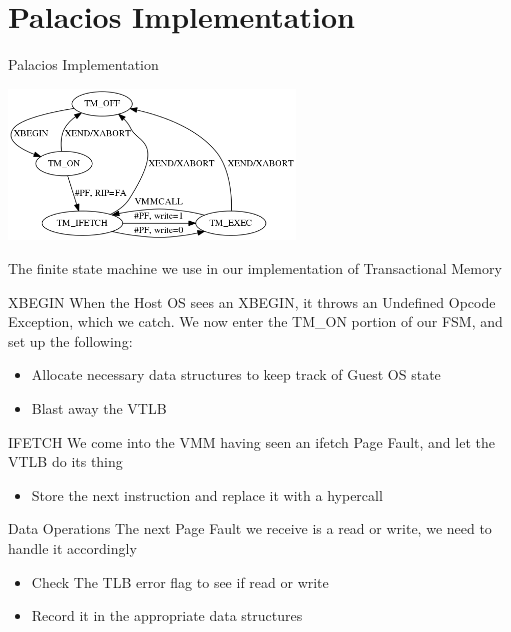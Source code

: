 \documentclass{beamer}
\begin{document}
\section{Palacios Implementation}
\begin{frame}{Palacios Implementation}
  \begin{center}
    \includegraphics[width=3.0in]{fsm.png}
  \end{center}
    
  The finite state machine we use in our implementation of Transactional
  Memory
\end{frame}

\begin{frame}{XBEGIN}
  When the Host OS sees an XBEGIN, it throws an Undefined Opcode Exception,
  which we catch. We now enter the TM\_ON portion of our FSM, and set up the
  following:

  \begin{itemize}
    \item Allocate necessary data structures to keep track of Guest OS state
    \item Blast away the VTLB
  \end{itemize}
\end{frame}
    
\begin{frame}{IFETCH}
  We come into the VMM having seen an ifetch Page Fault, and let the VTLB do its
  thing

  \begin{itemize}
    \item Store the next instruction and replace it with a hypercall
  \end{itemize}
\end{frame}

\begin{frame}{Data Operations}
  The next Page Fault we receive is a read or write, we need to handle it
  accordingly

  \begin{itemize}
    \item Check The TLB error flag to see if read or write
    \item Record it in the appropriate data structures
  \end{itemize}
\end{frame}
\end{document}
